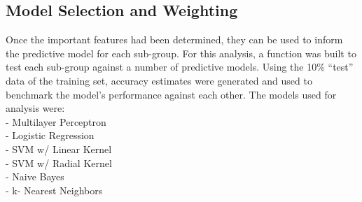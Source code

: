 \documentclass[
]{article}
\begin{document}
\hypertarget{model-selection-and-weighting}{%
\subsection{Model Selection and Weighting}\label{model-selection-and-weighting}}

Once the important features had been determined, they can be used to inform the predictive model for each sub-group.
For this analysis, a function was built to test each sub-group against a number of predictive models. Using the 10\% ``test'' data of the training set, accuracy estimates were generated and used to benchmark the model's performance against each other. The models used for analysis were:\\
- Multilayer Perceptron\\
- Logistic Regression\\
- SVM w/ Linear Kernel\\
- SVM w/ Radial Kernel\\
- Naive Bayes\\
- k- Nearest Neighbors
\end{document}
